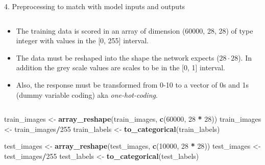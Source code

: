 \documentclass[10pt,ignorenonframetext,]{beamer}
\newenvironment{Shaded}{\begin{snugshade}}{\end{snugshade}}
\newcommand{\DecValTok}[1]{\textcolor[rgb]{0.00,0.00,0.81}{#1}}
\newcommand{\KeywordTok}[1]{\textcolor[rgb]{0.13,0.29,0.53}{\textbf{#1}}}
\newcommand{\NormalTok}[1]{#1}
\newcommand{\OperatorTok}[1]{\textcolor[rgb]{0.81,0.36,0.00}{\textbf{#1}}}
\newcommand{\StringTok}[1]{\textcolor[rgb]{0.31,0.60,0.02}{#1}}
\begin{document}
\begin{frame}[fragile]

\begin{block}{4. Preprocessing to match with model inputs and outputs}

\(~\)

\begin{itemize}
\item
  The training data is scored in an array of dimension (60000, 28, 28)
  of type integer with values in the {[}0, 255{]} interval. \vspace{2mm}
\item
  The data must be reshaped into the shape the network expects
  (\(28\cdot 28\)). In addition the grey scale values are scales to be
  in the {[}0, 1{]} interval. \vspace{2mm}
\item
  Also, the response must be transformed from 0-10 to a vector of 0s and
  1s (dummy variable coding) aka \emph{one-hot-coding}.
\end{itemize}

\(~\)

\scriptsize

\begin{Shaded}
\begin{Highlighting}[]
\NormalTok{train_images <-}\StringTok{ }\KeywordTok{array_reshape}\NormalTok{(train_images, }\KeywordTok{c}\NormalTok{(}\DecValTok{60000}\NormalTok{, }\DecValTok{28} \OperatorTok{*}\StringTok{ }\DecValTok{28}\NormalTok{))}
\NormalTok{train_images <-}\StringTok{ }\NormalTok{train_images}\OperatorTok{/}\DecValTok{255}
\NormalTok{train_labels <-}\StringTok{ }\KeywordTok{to_categorical}\NormalTok{(train_labels)}

\NormalTok{test_images <-}\StringTok{ }\KeywordTok{array_reshape}\NormalTok{(test_images, }\KeywordTok{c}\NormalTok{(}\DecValTok{10000}\NormalTok{, }\DecValTok{28} \OperatorTok{*}\StringTok{ }\DecValTok{28}\NormalTok{))}
\NormalTok{test_images <-}\StringTok{ }\NormalTok{test_images}\OperatorTok{/}\DecValTok{255}
\NormalTok{test_labels <-}\StringTok{ }\KeywordTok{to_categorical}\NormalTok{(test_labels)}
\end{Highlighting}
\end{Shaded}

\end{block}

\end{frame}
\end{document}
